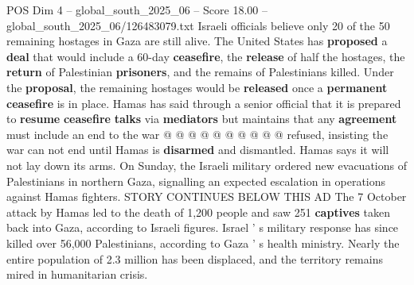 \begin{textsample}{POS Dim 4 – global\_south\_2025\_06 – Score 18.00 – global\_south\_2025\_06/126483079.txt}
Israeli officials believe only 20 of the 50 remaining hostages in Gaza are still alive.
The United States has \textbf{proposed} a \textbf{deal} that would include a 60-day \textbf{ceasefire}, the \textbf{release} of half the hostages, the \textbf{return} of Palestinian \textbf{prisoners}, and the remains of Palestinians killed.
Under the \textbf{proposal}, the remaining hostages would be \textbf{released} once a \textbf{permanent} \textbf{ceasefire} is in place.
Hamas has said through a senior official that it is prepared to \textbf{resume} \textbf{ceasefire} \textbf{talks} via \textbf{mediators} but maintains that any \textbf{agreement} must include an end to the war @ @ @ @ @ @ @ @ @ @ refused, insisting the war can not end until Hamas is \textbf{disarmed} and dismantled.
Hamas says it will not lay down its arms.
On Sunday, the Israeli military ordered new evacuations of Palestinians in northern Gaza, signalling an expected escalation in operations against Hamas fighters.
STORY CONTINUES BELOW THIS AD The 7 October attack by Hamas led to the death of 1,200 people and saw 251 \textbf{captives} taken back into Gaza, according to Israeli figures.
Israel ' s military response has since killed over 56,000 Palestinians, according to Gaza ' s health ministry.
Nearly the entire population of 2.3 million has been displaced, and the territory remains mired in humanitarian crisis.

\end{textsample}
